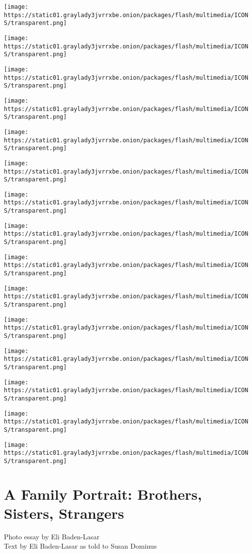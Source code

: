 \texttt{[image: https://static01.graylady3jvrrxbe.onion/packages/flash/multimedia/ICONS/transparent.png]}

\texttt{[image: https://static01.graylady3jvrrxbe.onion/packages/flash/multimedia/ICONS/transparent.png]}

\texttt{[image: https://static01.graylady3jvrrxbe.onion/packages/flash/multimedia/ICONS/transparent.png]}

\texttt{[image: https://static01.graylady3jvrrxbe.onion/packages/flash/multimedia/ICONS/transparent.png]}

\texttt{[image: https://static01.graylady3jvrrxbe.onion/packages/flash/multimedia/ICONS/transparent.png]}

\texttt{[image: https://static01.graylady3jvrrxbe.onion/packages/flash/multimedia/ICONS/transparent.png]}

\texttt{[image: https://static01.graylady3jvrrxbe.onion/packages/flash/multimedia/ICONS/transparent.png]}

\texttt{[image: https://static01.graylady3jvrrxbe.onion/packages/flash/multimedia/ICONS/transparent.png]}

\texttt{[image: https://static01.graylady3jvrrxbe.onion/packages/flash/multimedia/ICONS/transparent.png]}

\texttt{[image: https://static01.graylady3jvrrxbe.onion/packages/flash/multimedia/ICONS/transparent.png]}

\texttt{[image: https://static01.graylady3jvrrxbe.onion/packages/flash/multimedia/ICONS/transparent.png]}

\texttt{[image: https://static01.graylady3jvrrxbe.onion/packages/flash/multimedia/ICONS/transparent.png]}

\texttt{[image: https://static01.graylady3jvrrxbe.onion/packages/flash/multimedia/ICONS/transparent.png]}

\texttt{[image: https://static01.graylady3jvrrxbe.onion/packages/flash/multimedia/ICONS/transparent.png]}

\texttt{[image: https://static01.graylady3jvrrxbe.onion/packages/flash/multimedia/ICONS/transparent.png]}

\hypertarget{a-family-portrait-brothers-sisters-strangers}{%
\section{A Family Portrait: Brothers, Sisters,
Strangers}\label{a-family-portrait-brothers-sisters-strangers}}

Photo essay by Eli Baden-Lasar\\
Text by Eli Baden-Lasar as told to Susan Dominus

